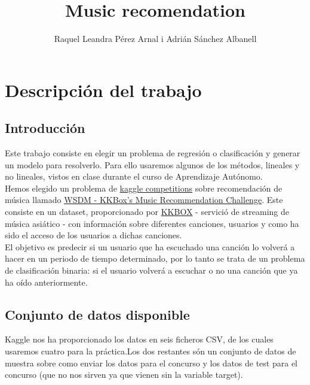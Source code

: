 \documentclass[a4paper]{article}
\title{Music recomendation}
\author{Raquel Leandra Pérez Arnal i Adrián Sánchez Albanell}
\date{} %
\begin{document}
\maketitle
\clearpage
\tableofcontents
\clearpage

\section{Descripción del trabajo}


\subsection{Introducción}
Este trabajo consiste en elegir un problema de regresión o clasificación y generar un modelo para resolverlo. Para ello usaremos algunos de los métodos, lineales y no lineales, vistos en clase durante el curso de Aprendizaje Autónomo.\\
Hemos elegido un problema de \href{https://www.kaggle.com/competitions}{kaggle competitions} sobre recomendación de música llamado \href{https://www.kaggle.com/c/kkbox-music-recommendation-challenge}{WSDM - KKBox's Music Recommendation Challenge}. Este consiste en un dataset, proporcionado por \href{https://www.kkbox.com/intl/index.php?area=intl}{KKBOX} - servició de streaming de música asiático - con información sobre diferentes canciones, usuarios y como ha sido el acceso de los usuarios a dichas canciones.\\
El objetivo es predecir si un usuario que ha escuchado una canción lo volverá a hacer en un periodo de tiempo determinado, por lo tanto se trata de un problema de clasificación binaria: si el usuario volverá a escuchar o no una canción que ya ha oído anteriormente.


\subsection{Conjunto de datos disponible}
Kaggle nos ha proporcionado los datos en seis ficheros CSV, de los cuales usaremos cuatro para la práctica.Los dos restantes són un conjunto de datos de muestra sobre como enviar los datos para el concurso y los datos de test para el concurso (que no nos sirven ya que vienen sin la variable target).
\end{document}
